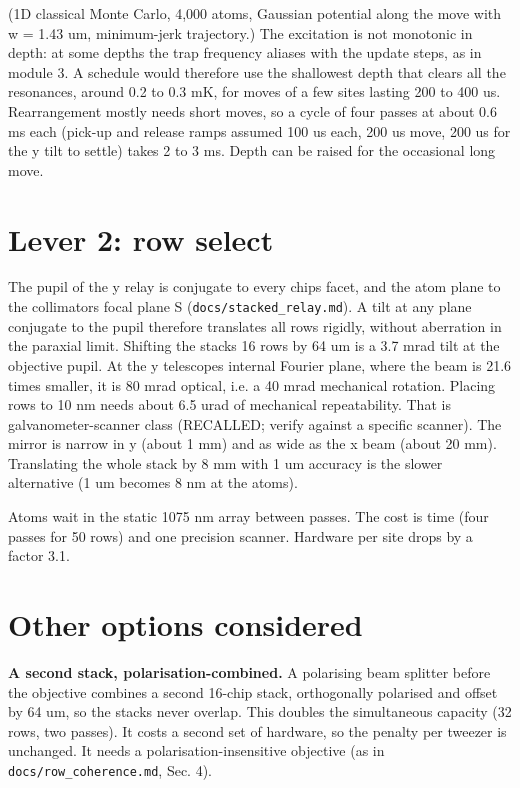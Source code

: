 (1D classical Monte Carlo, 4,000 atoms, Gaussian potential along the
move with w = 1.43 um, minimum-jerk trajectory.) The excitation is not
monotonic in depth: at some depths the trap frequency aliases with the
update steps, as in module 3. A schedule would therefore use the
shallowest depth that clears all the resonances, around 0.2 to 0.3 mK,
for moves of a few sites lasting 200 to 400 us. Rearrangement mostly
needs short moves, so a cycle of four passes at about 0.6 ms each
(pick-up and release ramps assumed 100 us each, 200 us move, 200 us for
the y tilt to settle) takes 2 to 3 ms. Depth can be raised for the
occasional long move.

\hypertarget{4-lever-2-row-select}{%
\section{Lever 2: row select}\label{scaling_beyond-4-lever-2-row-select}}

The pupil of the y relay is conjugate to every chip\textquotesingle s
facet, and the atom plane to the collimators\textquotesingle{} focal
plane S (\texttt{docs/stacked\_relay.md}). A tilt at any plane conjugate
to the pupil therefore translates all rows rigidly, without aberration
in the paraxial limit. Shifting the stack\textquotesingle s 16 rows by
64 um is a 3.7 mrad tilt at the objective pupil. At the y
telescope\textquotesingle s internal Fourier plane, where the beam is
21.6 times smaller, it is 80 mrad optical, i.e. a 40 mrad mechanical
rotation. Placing rows to 10 nm needs about 6.5 urad of mechanical
repeatability. That is galvanometer-scanner class (RECALLED; verify
against a specific scanner). The mirror is narrow in y (about 1 mm) and
as wide as the x beam (about 20 mm). Translating the whole stack by 8 mm
with 1 um accuracy is the slower alternative (1 um becomes 8 nm at the
atoms).

Atoms wait in the static 1075 nm array between passes. The cost is time
(four passes for 50 rows) and one precision scanner. Hardware per site
drops by a factor 3.1.

\hypertarget{5-other-options-considered}{%
\section{Other options considered}\label{scaling_beyond-5-other-options-considered}}

\textbf{A second stack, polarisation-combined.} A polarising beam
splitter before the objective combines a second 16-chip stack,
orthogonally polarised and offset by 64 um, so the stacks never overlap.
This doubles the simultaneous capacity (32 rows, two passes). It costs a
second set of hardware, so the penalty per tweezer is unchanged. It
needs a polarisation-insensitive objective (as in
\texttt{docs/row\_coherence.md}, Sec. 4).

